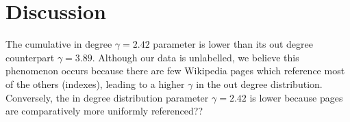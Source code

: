 \documentclass[9pt,a4paper]{article}
\begin{document}
\section{Discussion}

The cumulative in degree $\gamma = 2.42$ parameter is lower than its out degree counterpart $\gamma = 3.89$. Although our data is unlabelled, we believe this phenomenon occurs because there are few Wikipedia pages which reference most of the others (indexes), leading to a higher $\gamma$ in the out degree distribution. Conversely, the in degree distribution parameter $\gamma = 2.42$ is lower because pages are comparatively more uniformly referenced??



\end{document}

